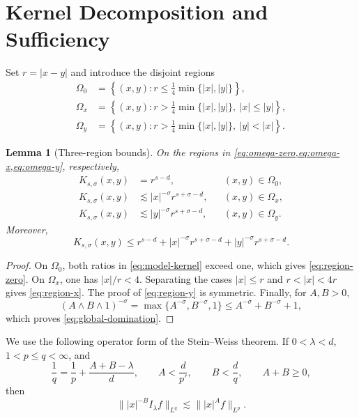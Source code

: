 \documentclass[11pt]{amsart}
\numberwithin{equation}{section}
\theoremstyle{plain}
\newtheorem{lemma}[theorem]{Lemma}
\theoremstyle{definition}
\theoremstyle{remark}
\begin{document}
\section{Kernel Decomposition and Sufficiency}
\label{sec:sufficiency}

Set $r=|x-y|$ and introduce the disjoint regions
\begin{align}
 \Omega_0
 &=\left\{(x,y):r\le\tfrac14\min\{|x|,|y|\}\right\},
 \label{eq:omega-zero}\\
 \Omega_x
 &=\left\{(x,y):r>\tfrac14\min\{|x|,|y|\},\ |x|\le|y|\right\},
 \label{eq:omega-x}\\
 \Omega_y
 &=\left\{(x,y):r>\tfrac14\min\{|x|,|y|\},\ |y|<|x|\right\}.
 \label{eq:omega-y}
\end{align}

\begin{lemma}[Three-region bounds]
\label{lem:three-regions}
On the regions in \cref{eq:omega-zero,eq:omega-x,eq:omega-y}, respectively,
\begin{align}
 K_{s,\sigma}(x,y)&=r^{s-d},
 &&(x,y)\in\Omega_0,
 \label{eq:region-zero}\\
 K_{s,\sigma}(x,y)&\lesssim |x|^{-\sigma}r^{s+\sigma-d},
 &&(x,y)\in\Omega_x,
 \label{eq:region-x}\\
 K_{s,\sigma}(x,y)&\lesssim |y|^{-\sigma}r^{s+\sigma-d},
 &&(x,y)\in\Omega_y.
 \label{eq:region-y}
\end{align}
Moreover,
\begin{equation}
 K_{s,\sigma}(x,y)
 \le r^{s-d}
 +|x|^{-\sigma}r^{s+\sigma-d}
 +|y|^{-\sigma}r^{s+\sigma-d}.
 \label{eq:global-domination}
\end{equation}
\end{lemma}

\begin{proof}
On $\Omega_0$, both ratios in \cref{eq:model-kernel} exceed one, which gives \cref{eq:region-zero}. On $\Omega_x$, one has $|x|/r<4$. Separating the cases $|x|\le r$ and $r<|x|<4r$ gives \cref{eq:region-x}. The proof of \cref{eq:region-y} is symmetric. Finally, for $A,B>0$,
\[
 (A\wedge B\wedge1)^{-\sigma}
 =\max\{A^{-\sigma},B^{-\sigma},1\}
 \le A^{-\sigma}+B^{-\sigma}+1,
\]
which proves \cref{eq:global-domination}.
\end{proof}

We use the following operator form of the Stein--Weiss theorem. If $0<\lambda<d$, $1<p\le q<\infty$, and
\begin{equation}
 \frac1q=\frac1p+\frac{A+B-\lambda}{d},
 \qquad
 A<\frac d{p'},
 \qquad
 B<\frac d q,
 \qquad
 A+B\ge0,
 \label{eq:stein-weiss-conditions}
\end{equation}
then
\begin{equation}
 \bigl\||x|^{-B}I_\lambda f\bigr\|_{L^q}
 \lesssim
 \bigl\||x|^A f\bigr\|_{L^p}.
 \label{eq:stein-weiss}
\end{equation}
\end{document}
